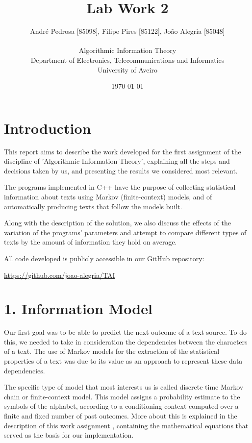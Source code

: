 \documentclass[12pt]{article}
\title{Lab Work 2}
\author
{André Pedrosa [85098], Filipe Pires [85122], João Alegria [85048]\\
\\
Algorithmic Information Theory\\
\normalsize{Department of Electronics, Telecommunications and Informatics}\\
\normalsize{University of Aveiro}\\
}
\date{\today{}}
\begin{document}
 

\baselineskip18pt

\maketitle 

\section*{Introduction}

This report aims to describe the work developed for the first assignment
of the discipline of 'Algorithmic Information Theory', explaining all the 
steps and decisions taken by us, and presenting the results we considered 
most relevant. 

The programs implemented in C++ have the purpose of collecting statistical
information about texts using Markov (finite-context) models, and of 
automatically producing texts that follow the models built.

Along with the description of the solution, we also discuss the effects
of the variation of the programs' parameters and attempt to compare 
different types of texts by the amount of information they hold on average.

All code developed is publicly accessible in our GitHub repository:

\url{https://github.com/joao-alegria/TAI}
\newpage

\section*{1. Information Model}

Our first goal was to be able to predict the next outcome of a text source.
To do this, we needed to take in consideration the dependencies between 
the characters of a text.
The use of Markov models for the extraction of the statistical properties of a
text was due to its value as an approach to represent these data dependencies.

The specific type of model that most interests us is called discrete time
Markov chain or finite-context model.
This model assigns a probability estimate to the symbols of the alphabet, 
according to a conditioning context computed over a finite and fixed number
of past outcomes. 
More about this is explained in the description of this work assignment 
\cite{trab1}, containing the mathematical equations that served as the basis 
for our implementation.
\end{document}
